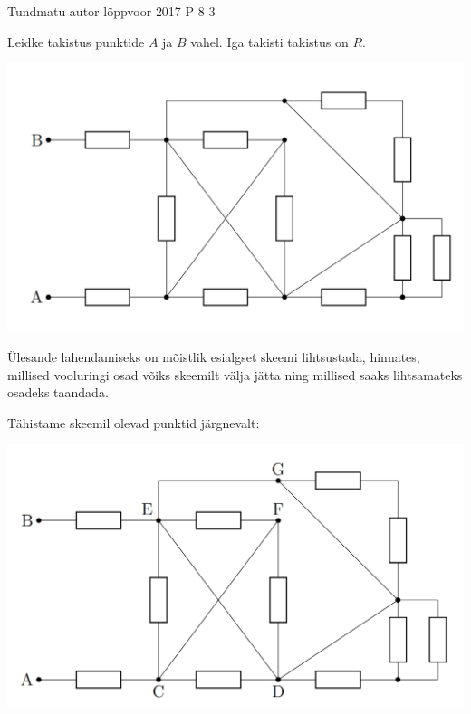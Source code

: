 {Tundmatu autor} %
{lõppvoor} %
{2017} %
{P 8} %
{3} %
{

\ifStatement
Leidke takistus punktide $A$ ja $B$ vahel. Iga takisti takistus on $R$.
\begin{center}
	\includegraphics[width=0.5\linewidth]{2017-v3p-08-yl.png}
\end{center}
\fi

\ifHint
Ülesande lahendamiseks on mõistlik esialgset skeemi lihtsustada, hinnates, millised vooluringi osad võiks skeemilt välja jätta ning millised saaks lihtsamateks osadeks taandada.
\fi

\ifSolution
Tähistame skeemil olevad punktid järgnevalt:
\begin{center}
	\includegraphics[width=0.5\linewidth]{2017-v3p-08-lah1.png}
\end{center}

}
